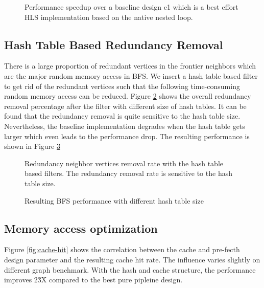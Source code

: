 \begin{figure}
    \caption{Performance speedup over a baseline design c1 which 
    is a best effort HLS implementation based on the native nested loop.}
\label{fig:pipeline-performance}
\end{figure}

\subsection{Hash Table Based Redundancy Removal}
There is a large proportion of redundant vertices in the frontier neighbors which 
are the major random memory access in BFS. We insert a hash table based filter to 
get rid of the redundant vertices such that the following time-consuming random memory access 
can be reduced. Figure \ref{fig:hash-redundancy} shows the overall redundancy 
removal percentage after the filter with different size of hash tables. It can be found that 
the redundancy removal is quite sensitive to the hash table size.
Nevertheless, the baseline implementation degrades when the hash table gets larger which 
even leads to the performance drop. The resulting performance is shown in Figure \ref{fig:hash-performance} 

\begin{figure}
    \caption{Redundancy neighbor vertices removal rate with the hash table based filters. 
    The redundancy removal rate is sensitive to the hash table size.}
\label{fig:hash-redundancy}
\end{figure}

\begin{figure}
    \caption{Resulting BFS performance with different hash table size}
\label{fig:hash-performance}
\end{figure}


\subsection{Memory access optimization}
Figure \ref{fig:cache-hit} shows the correlation between the 
cache and pre-fecth design parameter and the resulting cache 
hit rate. The influence varies slightly on different graph benchmark. 
With the hash and cache structure, the performance improves 2\~3X compared to 
the best pure pipleine design.

